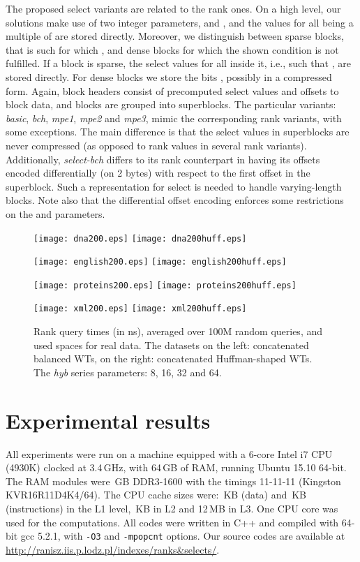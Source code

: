 \documentclass{llncs}
\begin{document}
The proposed select variants are related to the rank ones.
On a high level, our solutions make use of two integer parameters, 
 and , and the  values for all  being a multiple 
of  are stored directly.
Moreover, we distinguish between sparse blocks, that is such for which 
, and dense blocks for which 
the shown condition is not fulfilled.
If a block is sparse, the select values for all  inside it, 
i.e., such that , are stored directly.
For dense blocks we store the bits 
, 
possibly in a compressed form.
Again, block headers consist of precomputed select values and offsets to block data, 
and blocks are grouped into superblocks.
The particular variants: {\em basic}, {\em bch}, {\em mpe1}, {\em mpe2} and 
{\em mpe3}, mimic the corresponding rank variants, with some exceptions.
The main difference is that the select values in superblocks are never compressed 
(as opposed to rank values in several rank variants).
Additionally, {\em select-bch} differs to its rank counterpart in having 
its offsets encoded differentially (on 2 bytes) with respect to the first offset 
in the superblock.
Such a representation for select is needed to handle varying-length blocks.
Note also that the differential offset encoding enforces some restrictions 
on the  and  parameters.



\begin{figure}
\centerline{
\texttt{[image: dna200.eps]}
\texttt{[image: dna200huff.eps]}
}
\centerline{
\texttt{[image: english200.eps]}
\texttt{[image: english200huff.eps]}
}
\centerline{
\texttt{[image: proteins200.eps]}
\texttt{[image: proteins200huff.eps]}
}
\centerline{
\texttt{[image: xml200.eps]}
\texttt{[image: xml200huff.eps]}
}

\caption[Results]
{Rank query times (in ns), averaged over 100M random queries,
and used spaces for real data.
The datasets on the left: concatenated balanced WTs, 
on the right: concatenated Huffman-shaped WTs.
The {\em hyb} series parameters: 8, 16, 32 and 64.
}
\label{fig:cranks1}
\end{figure}


\section{Experimental results}
\label{sec:exp}
\noindent
All experiments were run on a machine equipped with 
a 6-core Intel i7 CPU 
(4930K) 
clocked at 3.4\,GHz, with 64\,GB of RAM, 
running Ubuntu 15.10 64-bit.
The RAM modules were \,GB DDR3-1600 with the timings 
11-11-11 (Kingston KVR16R11D4K4/64).
The CPU cache sizes were: 
\,KB (data) and \,KB (instructions) in the L1 level, 
\,KB in L2 
and 12\,MB in L3.
One CPU core was used for the computations.
All codes were written in C++ and compiled with 64-bit gcc 5.2.1,
with \texttt{-O3} and \texttt{-mpopcnt} options.
Our source codes 
are available at
\url{http://ranisz.iis.p.lodz.pl/indexes/ranks&selects/}.
\end{document}
